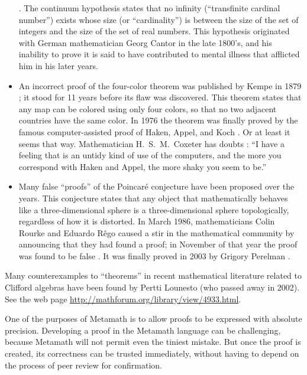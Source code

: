 \begin{itemize}
\cite[p.~166]{Enderton}.  The continuum hypothesis states that no
infinity (``transfinite cardinal number'') exists whose size (or ``cardinality'') is
between the size of the set of integers and the size of the set of real
numbers.  This hypothesis originated with German mathematician Georg
Cantor in the late 1800's, and his inability to prove it
is said to have contributed to mental illness that afflicted him in his later
years.
  \item An incorrect proof of the four-color theorem
was published by Kempe in 1879
\cite[p.~582]{Courant}; it stood for 11 years before
its flaw was discovered.  This theorem states that any map can be colored
using only four colors, so that no two adjacent countries have the same
color.  In 1976 the theorem was finally proved by the famous computer-assisted
proof of Haken, Appel, and Koch \cite{Swart}.  Or at least it seems that way.  Mathematician
H.~S.~M.~Coxeter has doubts \cite[p.~58]{Davis}:  ``I
have a feeling that is an untidy kind of use of the computers, and the more
you correspond with Haken and Appel, the more shaky you seem to be.''
  \item Many false ``proofs'' of the Poincar\'{e}
conjecture have been proposed over the years.
This conjecture states that any object that mathematically behaves like a
three-dimensional sphere is a three-dimensional sphere topologically,
regardless of how it is distorted.  In March 1986, mathematicians Colin
Rourke and Eduardo R\^{e}go
caused  a stir in the mathematical community by announcing that they had found
a proof; in November of that year the proof was found to be false \cite[p.
218]{PetersonI}.  It was finally proved in 2003 by Grigory Perelman
\label{poincare}\cite{Szpiro}.
 \end{itemize}

Many counterexamples to ``theorems'' in recent mathematical
literature related to Clifford algebras
 have been found by Pertti
Lounesto (who passed away in 2002).
See the web page \url{http://mathforum.org/library/view/4933.html}.

One of the purposes of Metamath is to allow proofs to be
expressed with absolute precision.  Developing a proof in the Metamath
language can be challenging, because Metamath will not permit even the
tiniest mistake.  But once the proof is created, its
correctness can be trusted immediately, without having to depend on the
process of peer review for confirmation.

